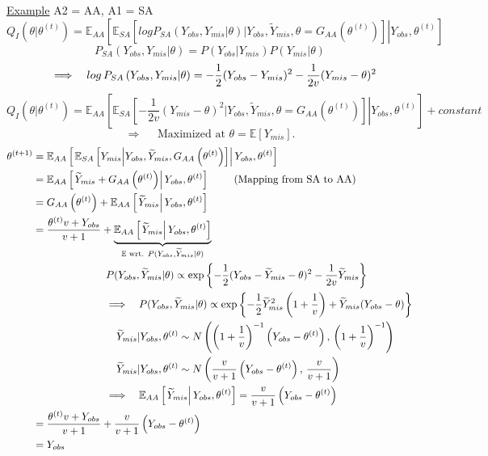 \documentclass[a4paper, 11pt]{report}
\newcommand{\tab}{\hspace*{1.0em}} %
\newcommand{\imply}{\tab \Longrightarrow \tab}
\newcommand{\yo}{Y_{obs}}
\newcommand{\ym}{Y_{mis}}
\newcommand{\yt}{\widetilde{Y}_{mis}}
\newcommand{\tht}{\theta^{(t)}}
\newcommand{\tho}{\theta^{(t+1)}}
\begin{document}
\begin{itemize}
		\underline{Example} A2 = AA, A1 = SA \\
		$$ Q_I \left( \theta | \tht \right) = \mathbb{E}_{AA} \left[ \left. \mathbb{E}_{SA} \left[ log P_{SA}\left(  \yo,\ym | \theta \right) \Big| \yo, \yt, \theta = G_{AA} \left(\tht \right) \right]  \right| \yo, \tht \right] $$
		$$ P_{SA}\left(  \yo,\ym | \theta \right) = P(\yo | \ym)P(\ym|\theta) $$
		$$ \imply log \, P_{SA}\left(  \yo,\ym | \theta \right) = -\frac{1}{2}(\yo - \ym)^2 - \frac{1}{2v}(\ym - \theta)^2 \\ $$
		$$ Q_I \left( \theta | \tht \right) = \mathbb{E}_{AA} \left[ \left. \mathbb{E}_{SA} \left[ - \frac{1}{2v}(\ym - \theta)^2  \Big| \yo, \yt, \theta = G_{AA} \left(\tht \right) \right]  \right| \yo, \tht \right] + constant $$
		$$ \Rightarrow {} \quad \text{  Maximized at } \theta = \mathbb{E}\left[\ym\right] . $$
		\begin{align*}
			\tho &= \mathbb{E}_{AA} \left[ \left. \mathbb{E}_{SA} \left[ \ym  \Big| \yo, \yt, G_{AA}\left(\tht\right) \right]  \right| \yo, \tht \right] \\  
			&= \mathbb{E}_{AA} \left[ \left. \yt + G_{AA}\left(\tht\right) \right| \yo, \tht \right]  \qquad \textrm{ (Mapping from SA to AA) } \\
			&= G_{AA}\left(\tht\right) + \mathbb{E}_{AA} \left[ \left. \yt \right| \yo, \tht \right] \\
			&= \frac{\tht v + \yo}{v+1} +  \underbrace{ \mathbb{E}_{AA} \left[ \left. \yt \right| \yo, \tht \right] }_{\mathbb{E} \textrm{ wrt. } P(\yo,\yt | \theta)} \\
			& \qquad \qquad \qquad \quad P(\yo,\yt | \theta) \propto \exp\left\lbrace -\frac{1}{2}(\yo - \yt - \theta)^2 - \frac{1}{2v} \yt \right\rbrace \\
			& \qquad \qquad \qquad \imply P(\yo,\yt | \theta) \propto \exp\left\lbrace -\frac{1}{2} \yt^2 \left(1+\frac{1}{v}\right) + \yt (\yo-\theta) \right\rbrace \\
			& \qquad \qquad \qquad \qquad \yt | \yo,\tht \sim N\left( \left(1+\frac{1}{v}\right)^{-1}\left(\yo-\tht\right), \, 			\left(1+\frac{1}{v}\right)^{-1} \right) \\
			& \qquad \qquad \qquad \qquad \yt | \yo,\tht \sim N\left( \frac{v}{v+1}\left(\yo-\tht\right), \, \frac{v}{v+1} \right) \\
			& \qquad \qquad \qquad \imply \mathbb{E}_{AA} \left[ \left. \yt \right| \yo, \tht \right] = \frac{v}{v+1} \left(\yo-\tht\right) \\
			&= \frac{\tht v + \yo}{v+1} + \frac{v}{v+1}\left(\yo-\tht\right) \\
			&= \yo			
		\end{align*}


\end{itemize}
\end{document}
